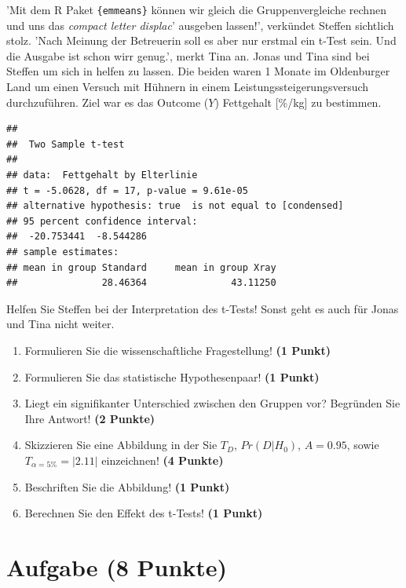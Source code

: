 \documentclass[a4paper, 9pt]{scrartcl}\usepackage[]{graphicx}\usepackage[]{xcolor}
\makeatletter
\newenvironment{kframe}{%
 \def\at@end@of@kframe{}%
 \ifinner\ifhmode%
  \def\at@end@of@kframe{\end{minipage}}%
  \begin{minipage}{\columnwidth}%
 \fi\fi%
 \def\FrameCommand##1{\hskip\@totalleftmargin \hskip-\fboxsep
 \colorbox{shadecolor}{##1}\hskip-\fboxsep
     \hskip-\linewidth \hskip-\@totalleftmargin \hskip\columnwidth}%
 \MakeFramed {\advance\hsize-\width
   \@totalleftmargin\z@ \linewidth\hsize
   \@setminipage}}%
 {\par\unskip\endMakeFramed%
 \at@end@of@kframe}
\newenvironment{knitrout}{}{} %
\makeatother
\begin{document}
'Mit dem R Paket \texttt{\{emmeans\}} können wir gleich die Gruppenvergleiche rechnen und uns das \textit{compact letter displac}' ausgeben lassen!', verkündet Steffen sichtlich stolz. 'Nach Meinung der Betreuerin soll es aber nur erstmal ein t-Test sein. Und die Ausgabe ist schon wirr genug.', merkt Tina an. Jonas und Tina sind bei Steffen um sich in \Rlogo helfen zu lassen. Die beiden waren 1 Monate im Oldenburger Land um einen Versuch mit Hühnern in einem Leistungssteigerungsversuch durchzuführen. Ziel war es das Outcome ($Y$) Fettgehalt [\%/kg] zu bestimmen.

\begin{knitrout}
\color{fgcolor}\begin{kframe}
\begin{verbatim}
## 
## 	Two Sample t-test
## 
## data:  Fettgehalt by Elterlinie
## t = -5.0628, df = 17, p-value = 9.61e-05
## alternative hypothesis: true  is not equal to [condensed]
## 95 percent confidence interval:
##  -20.753441  -8.544286
## sample estimates:
## mean in group Standard     mean in group Xray 
##               28.46364               43.11250
\end{verbatim}
\end{kframe}
\end{knitrout}

Helfen Sie Steffen bei der Interpretation des t-Tests! Sonst geht es auch für Jonas und Tina nicht weiter.
  
\begin{enumerate}
  \item Formulieren Sie die wissenschaftliche Fragestellung! \textbf{(1 Punkt)}
  \item Formulieren Sie das statistische Hypothesenpaar! \textbf{(1 Punkt)}
\item Liegt ein signifikanter Unterschied zwischen den Gruppen vor? Begründen Sie Ihre Antwort! \textbf{(2 Punkte)}
\item Skizzieren Sie eine Abbildung in der Sie $T_{D}$, $Pr(D|H_0)$, $A=0.95$, sowie $T_{\alpha=5\%} = |2.11|$ einzeichnen! \textbf{(4 Punkte)}
\item Beschriften Sie die Abbildung! \textbf{(1 Punkt)}  
\item Berechnen Sie den Effekt des t-Tests! \textbf{(1 Punkt)}
\end{enumerate} 
\clearpage

\section{Aufgabe \hfill (8 Punkte)}
\end{document}
